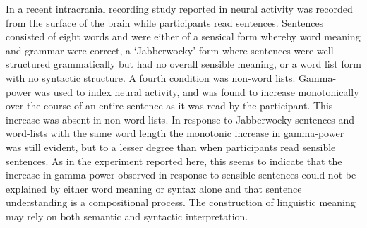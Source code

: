 \documentclass[a4paper,10pt,twoside]{article}
\begin{document}


In a recent intracranial recording study reported in
\cite{FedorenkoEtAl2016} neural activity was recorded from the surface
of the brain while participants read sentences. Sentences consisted of
eight words and were either of a sensical form whereby word meaning
and grammar were correct, a \lq{}Jabberwocky\rq{} form where sentences were
well structured grammatically but had no overall sensible meaning, or
a word list form with no syntactic structure. A fourth condition was
non-word lists. Gamma-power was used to index neural activity, and was
found to increase monotonically over the course of an entire sentence
as it was read by the participant. This increase was absent in
non-word lists. In response to Jabberwocky sentences and word-lists
with the same word length the monotonic increase in gamma-power was
still evident, but to a lesser degree than when participants read
sensible sentences. As in the experiment reported here, this seems to
indicate that the increase in gamma power observed in response to
sensible sentences could not be explained by either word meaning or
syntax alone and that sentence understanding is a compositional
process. The construction of linguistic meaning may rely on both
semantic and syntactic interpretation.
\end{document}
